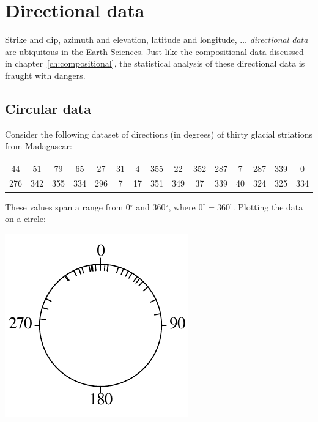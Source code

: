 \chapter{Directional data}
\label{ch:directional}

Strike and dip, azimuth and elevation, latitude and longitude,
$\ldots$ \textit{directional data} are ubiquitous in the Earth
Sciences. Just like the compositional data discussed in
chapter~\ref{ch:compositional}, the statistical analysis of these
directional data is fraught with dangers.

\section{Circular data}
\label{sec:circular}

Consider the following dataset of directions (in degrees) of thirty
glacial striations from Madagascar:

\begin{center}
\begin{tabular}{ccccccccccccccc}
44 & 51 & 79 & 65 & 27 & 31 & 4 & 355 & 22 & 352 & 287 & 7 & 287 & 339 & 0 \\
276 & 342 & 355 & 334 & 296 & 7 & 17 & 351 & 349 & 37 & 339 & 40 & 324 & 325 & 334\\
\end{tabular}
\end{center}

These values span a range from 0$^{\circ}$ and 360$^{\circ}$, where
$0^{\circ}=360^{\circ}$. Plotting the data on a circle:

\noindent\begin{minipage}[t][][b]{.25\textwidth}
\includegraphics[]{../figures/circle1.pdf}\medskip
\end{minipage}
\begin{minipage}[t][][t]{.75\textwidth}
  \label{fig:circle1}
\end{minipage}

